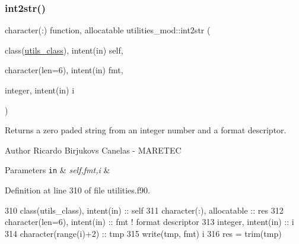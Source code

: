 \subsubsection{\texorpdfstring{int2str()}{int2str()}}
{\footnotesize\ttfamily character(\+:) function, allocatable utilities\+\_\+mod\+::int2str (\begin{DoxyParamCaption}\item[{class(\mbox{\hyperlink{structutilities__mod_1_1utils__class}{utils\+\_\+class}}), intent(in)}]{self,  }\item[{character(len=6), intent(in)}]{fmt,  }\item[{integer, intent(in)}]{i }\end{DoxyParamCaption})\hspace{0.3cm}{\ttfamily [private]}}



Returns a zero paded string from an integer number and a format descriptor. 

\begin{DoxyAuthor}{Author}
Ricardo Birjukovs Canelas -\/ M\+A\+R\+E\+T\+EC 
\end{DoxyAuthor}

\begin{DoxyParams}[1]{Parameters}
\mbox{\tt in}  & {\em self,fmt,i} & \\
\hline
\end{DoxyParams}


Definition at line 310 of file utilities.\+f90.


\begin{DoxyCode}
310     \textcolor{keywordtype}{class}(utils\_class), \textcolor{keywordtype}{intent(in)} :: self
311     \textcolor{keywordtype}{character(:)}, \textcolor{keywordtype}{allocatable} :: res
312     \textcolor{keywordtype}{character(len=6)}, \textcolor{keywordtype}{intent(in)} :: fmt \textcolor{comment}{! format descriptor}
313     \textcolor{keywordtype}{integer}, \textcolor{keywordtype}{intent(in)} :: i
314     \textcolor{keywordtype}{character(range(i)+2)} :: tmp
315     \textcolor{keyword}{write}(tmp, fmt) i
316     res = trim(tmp)
\end{DoxyCode}
\mbox{\label{namespaceutilities__mod_a1d16eada2f4cb344ad1500b3edba43fa}} 
